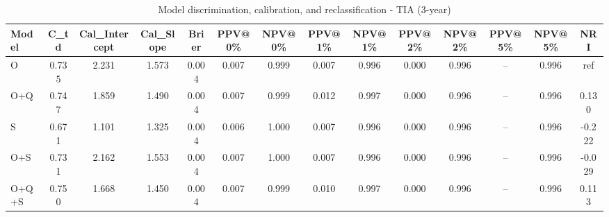 \begin{table}[htbp]
\centering
\small
\caption{Model discrimination, calibration, and reclassification - TIA (3-year)}
\label{tab:perf_tia_3y}
\begin{tabular}{lccccccccccccc}
\toprule
Model & C\_td & Cal\_Intercept & Cal\_Slope & Brier & PPV@0\% & NPV@0\% & PPV@1\% & NPV@1\% & PPV@2\% & NPV@2\% & PPV@5\% & NPV@5\% & NRI \\
\midrule
O & 0.735 & 2.231 & 1.573 & 0.004 & 0.007 & 0.999 & 0.007 & 0.996 & 0.000 & 0.996 & -- & 0.996 & ref \\
O+Q & 0.747 & 1.859 & 1.490 & 0.004 & 0.007 & 0.999 & 0.012 & 0.997 & 0.000 & 0.996 & -- & 0.996 & 0.130 \\
S & 0.671 & 1.101 & 1.325 & 0.004 & 0.006 & 1.000 & 0.007 & 0.996 & 0.000 & 0.996 & -- & 0.996 & -0.222 \\
O+S & 0.731 & 2.162 & 1.553 & 0.004 & 0.007 & 1.000 & 0.007 & 0.996 & 0.000 & 0.996 & -- & 0.996 & -0.029 \\
O+Q+S & 0.750 & 1.668 & 1.450 & 0.004 & 0.007 & 0.999 & 0.010 & 0.997 & 0.000 & 0.996 & -- & 0.996 & 0.113 \\
\bottomrule
\end{tabular}
\end{table}